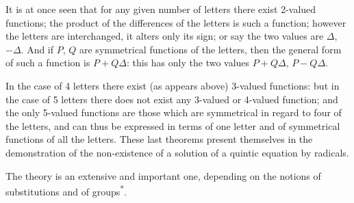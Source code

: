 \documentclass[11pt,a4paper]{article}
\begin{document}
It is at once seen that for any given number of letters there exist 2-valued functions; the product of the differences of the letters is such a function; however the letters are interchanged, it alters only its sign; or say the two values are $\Delta$, $-\Delta$. And if $P$, $Q$ are symmetrical functions of the letters, then the general form of such a function is $P + Q\Delta$: this has only the two values $P + Q\Delta$, $P - Q\Delta$.

In the case of 4 letters there exist (as appears above) 3-valued functions: but in the case of 5 letters there does not exist any 3-valued or 4-valued function; and the only 5-valued functions are those which are symmetrical in regard to four of the letters, and can thus be expressed in terms of one letter and of symmetrical functions of all the letters. These last theorems present themselves in the demonstration of the non-existence of a solution of a quintic equation by radicals.

The theory is an extensive and important one, depending on the notions of substitutions and of groups\textsuperscript{*}.
\end{document}
